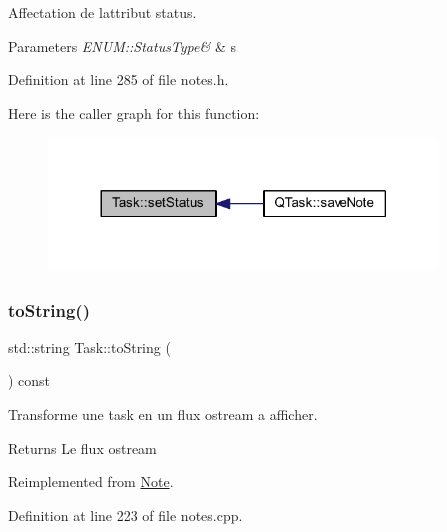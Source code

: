 Affectation de l\textquotesingle{}attribut status. 


\begin{DoxyParams}{Parameters}
{\em E\+N\+U\+M\+::\+Status\+Type\&} & s \\
\hline
\end{DoxyParams}


Definition at line 285 of file notes.\+h.

Here is the caller graph for this function\+:\nopagebreak
\begin{figure}[H]
\begin{center}
\leavevmode
\includegraphics[width=293pt]{class_task_aa76f619ae910047bd304797639eda9d5_icgraph}
\end{center}
\end{figure}
\mbox{\label{class_task_a7fe5cb7b57a21693e7abfea2f9618563}} 
\subsubsection{\texorpdfstring{to\+String()}{toString()}}
{\footnotesize\ttfamily std\+::string Task\+::to\+String (\begin{DoxyParamCaption}{ }\end{DoxyParamCaption}) const\hspace{0.3cm}{\ttfamily [virtual]}}



Transforme une task en un flux ostream a afficher. 

\begin{DoxyReturn}{Returns}
Le flux ostream 
\end{DoxyReturn}


Reimplemented from \hyperlink{class_note_a1bd4acfbde0b71d05fd7d4ca889bca2b}{Note}.



Definition at line 223 of file notes.\+cpp.

